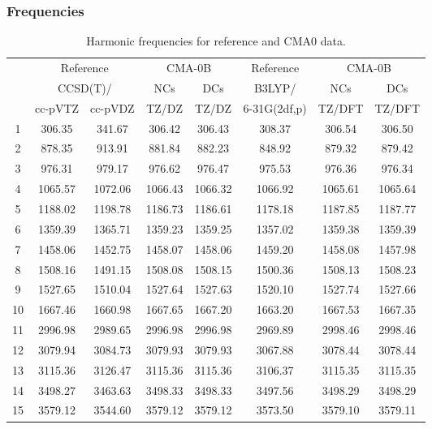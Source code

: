 \documentclass[10pt,oneside]{article}
\begin{document}
\clearpage

\subsubsection*{Frequencies}
\begin{table}[h!]
\centering
\caption{Harmonic frequencies for reference and CMA0 data.}
\begin{tabular}{cccccccc}
\toprule
{} & \multicolumn{2}{c}{Reference} & \multicolumn{2}{c}{CMA-0B} &    Reference & \multicolumn{2}{c}{CMA-0B} \\
{} & \multicolumn{2}{c}{CCSD(T)/} &     NCs &     DCs &       B3LYP/ &     NCs &     DCs \\
{} &   cc-pVTZ & cc-pVDZ &   TZ/DZ &   TZ/DZ & 6-31G(2df,p) &  TZ/DFT &  TZ/DFT \\
\midrule
1  &    306.35 &  341.67 &  306.42 &  306.43 &       308.37 &  306.54 &  306.50 \\
2  &    878.35 &  913.91 &  881.84 &  882.23 &       848.92 &  879.32 &  879.42 \\
3  &    976.31 &  979.17 &  976.62 &  976.47 &       975.53 &  976.36 &  976.34 \\
4  &   1065.57 & 1072.06 & 1066.43 & 1066.32 &      1066.92 & 1065.61 & 1065.64 \\
5  &   1188.02 & 1198.78 & 1186.73 & 1186.61 &      1178.18 & 1187.85 & 1187.77 \\
6  &   1359.39 & 1365.71 & 1359.23 & 1359.25 &      1357.02 & 1359.38 & 1359.39 \\
7  &   1458.06 & 1452.75 & 1458.07 & 1458.06 &      1459.20 & 1458.08 & 1457.98 \\
8  &   1508.16 & 1491.15 & 1508.08 & 1508.15 &      1500.36 & 1508.13 & 1508.23 \\
9  &   1527.65 & 1510.04 & 1527.64 & 1527.63 &      1520.10 & 1527.74 & 1527.66 \\
10 &   1667.46 & 1660.98 & 1667.65 & 1667.20 &      1663.20 & 1667.53 & 1667.35 \\
11 &   2996.98 & 2989.65 & 2996.98 & 2996.98 &      2969.89 & 2998.46 & 2998.46 \\
12 &   3079.94 & 3084.73 & 3079.93 & 3079.93 &      3067.88 & 3078.44 & 3078.44 \\
13 &   3115.36 & 3126.47 & 3115.36 & 3115.36 &      3106.37 & 3115.35 & 3115.35 \\
14 &   3498.27 & 3463.63 & 3498.33 & 3498.33 &      3497.56 & 3498.29 & 3498.29 \\
15 &   3579.12 & 3544.60 & 3579.12 & 3579.12 &      3573.50 & 3579.10 & 3579.11 \\
\bottomrule
\end{tabular}
\end{table}
\end{document}
